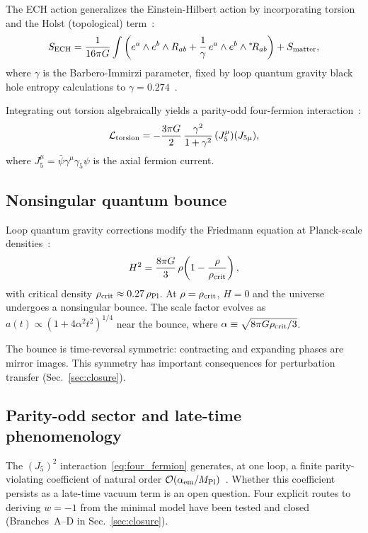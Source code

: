 \documentclass[aps,prd,twocolumn,superscriptaddress,showpacs,preprintnumbers,nofootinbib,longbibliography,floatfix]{revtex4-2}
\newcommand{\MPl}{M_{\rm Pl}}
\newcommand{\rhocrit}{\rho_{\rm crit}}
\newcommand{\rhoPl}{\rho_{\rm Pl}}
\begin{document}
The ECH action generalizes the Einstein-Hilbert action by incorporating
torsion and the Holst (topological) term~\cite{Holst1996}:
%
\begin{equation}\label{eq:ech_action}
S_{\rm ECH} = \frac{1}{16\pi G}\int \left(e^a \wedge e^b \wedge R_{ab}
  + \frac{1}{\gamma}\,e^a \wedge e^b \wedge {}^*\!R_{ab}\right) + S_{\rm matter},
\end{equation}
%
where $\gamma$ is the Barbero-Immirzi parameter, fixed by loop quantum gravity
black hole entropy calculations to $\gamma = 0.274$~\cite{Immirzi1997,Meissner2004,Ashtekar2004}.

Integrating out torsion algebraically yields a parity-odd four-fermion
interaction~\cite{Hehl1976,Shapiro2002}:
%
\begin{equation}\label{eq:four_fermion}
\mathcal{L}_{\rm torsion} = -\frac{3\pi G}{2}\,\frac{\gamma^2}{1+\gamma^2}\,
(J^\mu_5)(J_{5\mu}),
\end{equation}
%
where $J^\mu_5 = \bar{\psi}\gamma^\mu\gamma_5\psi$ is the axial fermion current.

\subsection{Nonsingular quantum bounce}\label{sec:bounce}

Loop quantum gravity corrections modify the Friedmann equation at Planck-scale
densities~\cite{Ashtekar2006,Bojowald2008}:
%
\begin{equation}\label{eq:modified_friedmann}
H^2 = \frac{8\pi G}{3}\,\rho\!\left(1 - \frac{\rho}{\rhocrit}\right),
\end{equation}
%
with critical density $\rhocrit \approx 0.27\,\rhoPl$.  At $\rho = \rhocrit$,
$H = 0$ and the universe undergoes a nonsingular bounce.  The scale factor
evolves as $a(t) \propto (1 + 4\alpha^2 t^2)^{1/4}$ near the bounce, where
$\alpha \equiv \sqrt{8\pi G\rhocrit/3}$.

The bounce is time-reversal symmetric: contracting and expanding phases are
mirror images.  This symmetry has important consequences for perturbation
transfer (Sec.~\ref{sec:closure}).

\subsection{Parity-odd sector and late-time phenomenology}

The $(J_5)^2$ interaction~\eqref{eq:four_fermion} generates, at one loop, a
finite parity-violating coefficient of natural order
$\mathcal{O}(\alpha_{\rm em}/\MPl)$~\cite{Alexander2009,Freidel2005}.
Whether this coefficient persists as a late-time vacuum term is an open
question.  Four explicit routes to deriving $w = -1$ from the minimal model
have been tested and closed (Branches~A--D in Sec.~\ref{sec:closure}).
\end{document}
